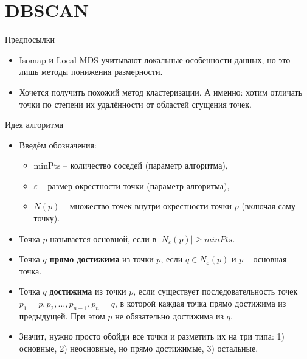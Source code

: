 \documentclass[9pt]{beamer}
\begin{document}
\section{DBSCAN}

\begin{frame}{Предпосылки}
\begin{itemize}
    \item Isomap и Local MDS учитывают локальные особенности данных, но это лишь методы понижения размерности.
    \item Хочется получить похожий метод кластеризации. А именно: хотим отличать точки по степени их удалённости от областей сгущения точек.
\end{itemize}
\end{frame}

\begin{frame}{Идея алгоритма}
\begin{itemize}
    \item Введём обозначения:
    \begin{itemize}
        \item minPts -- количество соседей (параметр алгоритма),
        \item $\varepsilon$ -- размер окрестности точки (параметр алгоритма),
        \item $N(p)$ -- множество точек внутри окрестности точки $p$ (включая саму точку).
    \end{itemize}
    \item Точка $p$ называется основной, если в $|N_\varepsilon(p)| \geq minPts$. 
    \item Точка $q$ \textbf{прямо достижима} из точки $p$, если $q\in N_\varepsilon(p)$ и $p$ -- основная точка.
    \item Точка $q$ \textbf{достижима} из точки $p$, если существует последовательность точек $p_1=p, p_2, \ldots, p_{n-1}, p_n = q$, в которой каждая точка прямо достижима из предыдущей. При этом $p$ не обязательно достижима из $q$.
    \item Значит, нужно просто обойди все точки и разметить их на три типа: 1) основные, 2) неосновные, но прямо достижимые, 3) остальные.
\end{itemize}
\end{frame}
\end{document}
